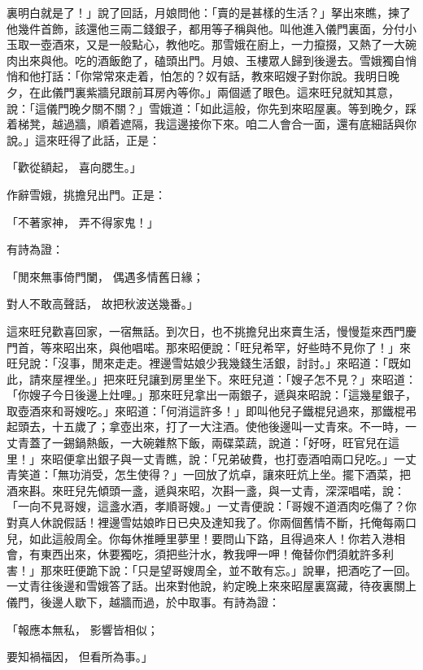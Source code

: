 裏明白就是了！」說了回話，月娘問他：「賣的是甚樣的生活？」拏出來瞧，揀了他幾件首飾，該還他三兩二錢銀子，都用等子稱與他。叫他進入儀門裏面，分付小玉取一壺酒來，又是一般點心，教他吃。那雪娥在廚上，一力攛掇，又熱了一大碗肉出來與他。吃的酒飯飽了，磕頭出門。月娘、玉樓眾人歸到後邊去。雪娥獨自悄悄和他打話：「你常常來走着，怕怎的？奴有話，教來昭嫂子對你說。我明日晚夕，在此儀門裏紫牆兒跟前耳房內等你。」兩個遞了眼色。這來旺兒就知其意，說：「這儀門晚夕關不關？」雪娥道：「如此這般，你先到來昭屋裏。等到晚夕，踩着梯凳，越過牆，順着遮隔，我這邊接你下來。咱二人會合一面，還有底細話與你說。」這來旺得了此話，正是：

「歡從額起，  喜向腮生。」

作辭雪娥，挑擔兒出門。正是：

「不著家神，  弄不得家鬼！」

有詩為證：

「閒來無事倚門闌，  偶遇多情舊日緣；

對人不敢高聲話，  故把秋波送幾番。」

這來旺兒歡喜回家，一宿無話。到次日，也不挑擔兒出來賣生活，慢慢踅來西門慶門首，等來昭出來，與他唱喏。那來昭便說：「旺兒希罕，好些時不見你了！」來旺兒說：「沒事，閒來走走。裡邊雪姑娘少我幾錢生活銀，討討。」來昭道：「既如此，請來屋裡坐。」把來旺兒讓到房里坐下。來旺兒道：「嫂子怎不見？」來昭道：「你嫂子今日後邊上灶哩。」那來旺兒拿出一兩銀子，遞與來昭說：「這幾星銀子，取壺酒來和哥嫂吃。」來昭道：「何消這許多！」即叫他兒子鐵棍兒過來，那鐵棍弔起頭去，十五歲了；拿壺出來，打了一大注酒。使他後邊叫一丈青來。不一時，一丈青蓋了一錫鍋熱飯，一大碗雜熬下飯，兩碟菜蔬，說道：「好呀，旺官兒在這里！」來昭便拿出銀子與一丈青瞧，說：「兄弟破費，也打壺酒咱兩口兒吃。」一丈青笑道：「無功消受，怎生使得？」一回放了炕卓，讓來旺炕上坐。擺下酒菜，把酒來斟。來旺兒先傾頭一盞，遞與來昭，次斟一盞，與一丈青，深深唱喏，說：「一向不見哥嫂，這盞水酒，孝順哥嫂。」一丈青便說：「哥嫂不道酒肉吃傷了？你對真人休說假話！裡邊雪姑娘昨日已央及達知我了。你兩個舊情不斷，托俺每兩口兒，如此這般周全。你每休推睡里夢里！要問山下路，且得過來人！你若入港相會，有東西出來，休要獨吃，須把些汁水，教我呷一呷！俺替你們須躭許多利害！」那來旺便跪下說：「只是望哥嫂周全，並不敢有忘。」說畢，把酒吃了一回。一丈青往後邊和雪娥答了話。出來對他說，約定晚上來來昭屋裏窩藏，待夜裏關上儀門，後邊人歇下，越牆而過，於中取事。有詩為證：

「報應本無私，  影響皆相似；

要知禍福因，  但看所為事。」

